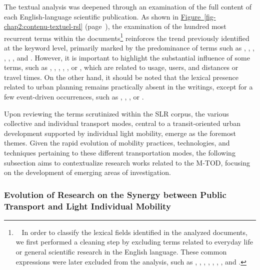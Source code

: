 \begin{refsegment}
The textual analysis was deepened through an examination of the full content of each English-language scientific publication. As shown in \hyperref[fig-chap2:contenu-textuel-rsl]{Figure~\ref{fig-chap2:contenu-textuel-rsl}} (page~\pageref{fig-chap2:contenu-textuel-rsl}), the examination of the hundred most recurrent terms within the documents\footnote{~
    In order to classify the lexical fields identified in the analyzed documents, we first performed a cleaning step by excluding terms related to everyday life or general scientific research in the English language. These common expressions were later excluded from the analysis, such as , , , , , , ,  and .
} reinforces the trend previously identified at the keyword level, primarily marked by the predominance of terms such as , , , , , , and . However, it is important to highlight the substantial influence of some terms, such as , , , , , or , which are related to usage, users, and distances or travel times. On the other hand, it should be noted that the lexical presence related to urban planning remains practically absent in the writings, except for a few event-driven occurrences, such as , , , or .%

Upon reviewing the terms scrutinized within the \acrshort{SLR} corpus, the various collective and individual transport modes, central to a transit-oriented urban development supported by individual light mobility, emerge as the foremost themes. Given the rapid evolution of mobility practices, technologies, and techniques pertaining to these different transportation modes, the following subsection aims to contextualize research works related to the \acrshort{M-TOD}, focusing on the development of emerging areas of investigation.%

\subsubsection*{Evolution of Research on the Synergy between Public Transport and Light Individual Mobility
    \label{chap2:evolution-recherches-tc-mobilite-individuelle-legere}
    }


\end{refsegment}
